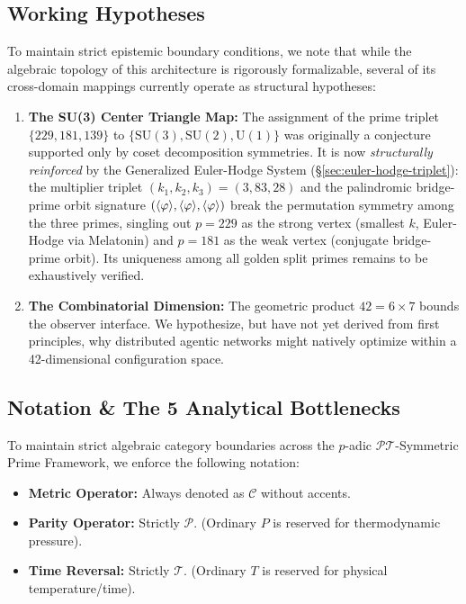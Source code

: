 \subsection*{Working Hypotheses}
To maintain strict epistemic boundary conditions, we note that while the algebraic topology of this architecture is rigorously formalizable, several of its cross-domain mappings currently operate as structural hypotheses:
\begin{enumerate}
    \item \textbf{The SU(3) Center Triangle Map:} The assignment of the prime triplet $\{229, 181, 139\}$ to $\{\text{SU}(3), \text{SU}(2), \text{U}(1)\}$ was originally a conjecture supported only by coset decomposition symmetries. It is now \emph{structurally reinforced} by the Generalized Euler-Hodge System (\S\ref{sec:euler-hodge-triplet}): the multiplier triplet $(k_1, k_2, k_3) = (3, 83, 28)$ and the palindromic bridge-prime orbit signature $(\langle\varphi\rangle, \langle\varphi\rangle, \langle\varphi\rangle)$ break the permutation symmetry among the three primes, singling out $p = 229$ as the strong vertex (smallest $k$, Euler-Hodge via Melatonin) and $p = 181$ as the weak vertex (conjugate bridge-prime orbit). Its uniqueness among all golden split primes remains to be exhaustively verified.
    \item \textbf{The Combinatorial Dimension:} The geometric product $42 = 6 \times 7$ bounds the observer interface. We hypothesize, but have not yet derived from first principles, why distributed agentic networks might natively optimize within a 42-dimensional configuration space.
\end{enumerate}

\subsection*{Notation \& The 5 Analytical Bottlenecks}
To maintain strict algebraic category boundaries across the $p$-adic $\mathcal{PT}$-Symmetric Prime Framework, we enforce the following notation:
\begin{itemize}
    \item \textbf{Metric Operator:} Always denoted as $\mathcal{C}$ without accents.
    \item \textbf{Parity Operator:} Strictly $\mathcal{P}$. (Ordinary $P$ is reserved for thermodynamic pressure).
    \item \textbf{Time Reversal:} Strictly $\mathcal{T}$. (Ordinary $T$ is reserved for physical temperature/time).
\end{itemize}

